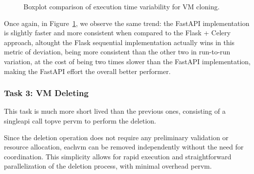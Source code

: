 \begin{figure}[ht]
                \caption{Boxplot comparison of execution time variability for VM cloning.}
                \label{fig:task2_boxplot}
            \end{figure}

            Once again, in Figure~\ref{fig:task2_boxplot}, we observe the same trend: the FastAPI implementation is slightly 
            faster and more consistent when compared to the Flask + Celery approach, altought the Flask sequential implementation 
            actually wins in this metric of deviation, being more consistent than the other two in run-to-run variation, at the cost of 
            being two times slower than the FastAPI implementation, making the FastAPI effort the overall better performer.


        \subsubsection{Task 3: VM Deleting}

            This task is much more short lived than the previous ones, consisting of a single\ac{api} call to\ac{pve} per\ac{vm} to 
            perform the deletion.

            Since the deletion operation does not require any preliminary validation or resource allocation, each\ac{vm} can be 
            removed independently without the need for coordination. This simplicity allows for rapid execution and straightforward 
            parallelization of the deletion process, with minimal overhead per\ac{vm}.
                        

